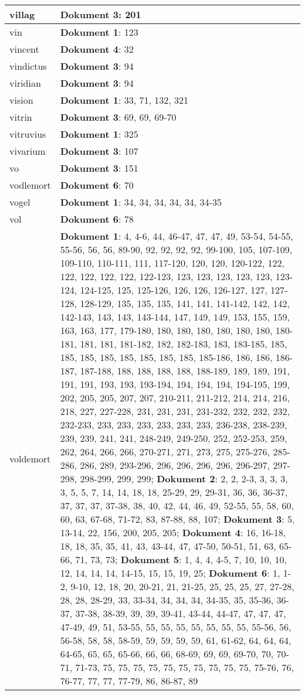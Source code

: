 \documentclass[a5paper]{article}
\begin{document}
\begin{longtable}[l]{|l|p{3in}|}
\hline
villag & \textbf{Dokument 3}: 201 \\
\hline
vin & \textbf{Dokument 1}: 123 \\
\hline
vincent & \textbf{Dokument 4}: 32 \\
\hline
vindictus & \textbf{Dokument 3}: 94 \\
\hline
viridian & \textbf{Dokument 3}: 94 \\
\hline
vision & \textbf{Dokument 1}: 33, 71, 132, 321 \\
\hline
vitrin & \textbf{Dokument 3}: 69, 69, 69-70 \\
\hline
vitruvius & \textbf{Dokument 1}: 325 \\
\hline
vivarium & \textbf{Dokument 3}: 107 \\
\hline
vo & \textbf{Dokument 3}: 151 \\
\hline
vodlemort & \textbf{Dokument 6}: 70 \\
\hline
vogel & \textbf{Dokument 1}: 34, 34, 34, 34, 34, 34-35 \\
\hline
vol & \textbf{Dokument 6}: 78 \\
\hline
voldemort & \textbf{Dokument 1}: 4, 4-6, 44, 46-47, 47, 47, 49, 53-54, 54-55, 55-56, 56, 56, 89-90, 92, 92, 92, 92, 99-100, 105, 107-109, 109-110, 110-111, 111, 117-120, 120, 120, 120-122, 122, 122, 122, 122, 122, 122-123, 123, 123, 123, 123, 123, 123-124, 124-125, 125, 125-126, 126, 126, 126-127, 127, 127-128, 128-129, 135, 135, 135, 141, 141, 141-142, 142, 142, 142-143, 143, 143, 143-144, 147, 149, 149, 153, 155, 159, 163, 163, 177, 179-180, 180, 180, 180, 180, 180, 180, 180-181, 181, 181, 181-182, 182, 182-183, 183, 183-185, 185, 185, 185, 185, 185, 185, 185, 185, 185-186, 186, 186, 186-187, 187-188, 188, 188, 188, 188, 188-189, 189, 189, 191, 191, 191, 193, 193, 193-194, 194, 194, 194, 194-195, 199, 202, 205, 205, 207, 207, 210-211, 211-212, 214, 214, 216, 218, 227, 227-228, 231, 231, 231, 231-232, 232, 232, 232, 232-233, 233, 233, 233, 233, 233, 233, 236-238, 238-239, 239, 239, 241, 241, 248-249, 249-250, 252, 252-253, 259, 262, 264, 266, 266, 270-271, 271, 273, 275, 275-276, 285-286, 286, 289, 293-296, 296, 296, 296, 296, 296-297, 297-298, 298-299, 299, 299; \textbf{Dokument 2}: 2, 2, 2-3, 3, 3, 3, 3, 5, 5, 7, 14, 14, 18, 18, 25-29, 29, 29-31, 36, 36, 36-37, 37, 37, 37, 37-38, 38, 40, 42, 44, 46, 49, 52-55, 55, 58, 60, 60, 63, 67-68, 71-72, 83, 87-88, 88, 107; \textbf{Dokument 3}: 5, 13-14, 22, 156, 200, 205, 205; \textbf{Dokument 4}: 16, 16-18, 18, 18, 35, 35, 41, 43, 43-44, 47, 47-50, 50-51, 51, 63, 65-66, 71, 73, 73; \textbf{Dokument 5}: 1, 4, 4, 4-5, 7, 10, 10, 10, 12, 14, 14, 14, 14-15, 15, 15, 19, 25; \textbf{Dokument 6}: 1, 1-2, 9-10, 12, 18, 20, 20-21, 21, 21-25, 25, 25, 25, 27, 27-28, 28, 28, 28-29, 33, 33-34, 34, 34, 34, 34-35, 35, 35-36, 36-37, 37-38, 38-39, 39, 39, 39-41, 43-44, 44-47, 47, 47, 47, 47-49, 49, 51, 53-55, 55, 55, 55, 55, 55, 55, 55, 55-56, 56, 56-58, 58, 58, 58-59, 59, 59, 59, 59, 61, 61-62, 64, 64, 64, 64-65, 65, 65, 65-66, 66, 66, 68-69, 69, 69, 69-70, 70, 70-71, 71-73, 75, 75, 75, 75, 75, 75, 75, 75, 75, 75, 75-76, 76, 76-77, 77, 77, 77-79, 86, 86-87, 89 \\

\end{longtable}
\end{document}
